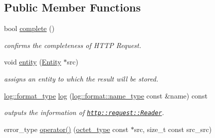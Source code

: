 \subsection*{Public Member Functions}
\begin{DoxyCompactItemize}
\item 
\hypertarget{classhryky_1_1http_1_1request_1_1_reader_a30d9a067a3c54b9d949ecc7a22e8e2e1}{bool \hyperlink{classhryky_1_1http_1_1request_1_1_reader_a30d9a067a3c54b9d949ecc7a22e8e2e1}{complete} ()}\label{classhryky_1_1http_1_1request_1_1_reader_a30d9a067a3c54b9d949ecc7a22e8e2e1}

\begin{DoxyCompactList}\small\item\em confirms the completeness of H\-T\-T\-P Request. \end{DoxyCompactList}\item 
\hypertarget{classhryky_1_1http_1_1request_1_1_reader_a533b30d861e82ddc5f1c2d5b282b38b4}{void \hyperlink{classhryky_1_1http_1_1request_1_1_reader_a533b30d861e82ddc5f1c2d5b282b38b4}{entity} (\hyperlink{classhryky_1_1http_1_1request_1_1_entity}{Entity} $\ast$src)}\label{classhryky_1_1http_1_1request_1_1_reader_a533b30d861e82ddc5f1c2d5b282b38b4}

\begin{DoxyCompactList}\small\item\em assigns an entity to which the result will be stored. \end{DoxyCompactList}\item 
\hypertarget{classhryky_1_1http_1_1request_1_1_reader_a68e62284099638ec3942b10a52371d6c}{\hyperlink{namespacehryky_1_1log_ad50448c3f934f1eacd5c1bcffe8111e1}{log\-::format\-\_\-type} \hyperlink{classhryky_1_1http_1_1request_1_1_reader_a68e62284099638ec3942b10a52371d6c}{log} (\hyperlink{namespacehryky_1_1log_1_1format_ab7408d1e2ed2d648dbf9bba69eb74288}{log\-::format\-::name\-\_\-type} const \&name) const }\label{classhryky_1_1http_1_1request_1_1_reader_a68e62284099638ec3942b10a52371d6c}

\begin{DoxyCompactList}\small\item\em outputs the information of \href{http::request::Reader}{\tt http\-::request\-::\-Reader}. \end{DoxyCompactList}\item 
\hypertarget{classhryky_1_1http_1_1request_1_1_reader_a9296b2ba874c791020f19cc7e422c61c}{error\-\_\-type \hyperlink{classhryky_1_1http_1_1request_1_1_reader_a9296b2ba874c791020f19cc7e422c61c}{operator()} (\hyperlink{namespacehryky_a488cba8b666be33ccca70e819684e3c8}{octet\-\_\-type} const $\ast$src, size\-\_\-t const src\-\_\-src)}\label{classhryky_1_1http_1_1request_1_1_reader_a9296b2ba874c791020f19cc7e422c61c}


\end{DoxyCompactItemize}
